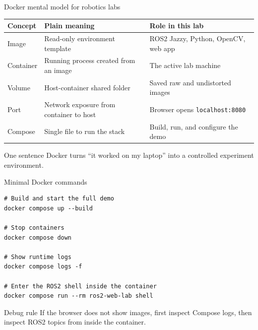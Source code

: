 \documentclass[aspectratio=169,10pt]{beamer}
\newcommand{\code}[1]{\texttt{#1}}
\begin{document}
\begin{frame}{Docker mental model for robotics labs}
  \begin{tabularx}{\textwidth}{@{}l X X@{}}
    \toprule
    Concept & Plain meaning & Role in this lab \\
    \midrule
    Image & Read-only environment template & ROS2 Jazzy, Python, OpenCV, web app \\
    Container & Running process created from an image & The active lab machine \\
    Volume & Host-container shared folder & Saved raw and undistorted images \\
    Port & Network exposure from container to host & Browser opens \code{localhost:8080} \\
    Compose & Single file to run the stack & Build, run, and configure the demo \\
    \bottomrule
  \end{tabularx}
  \vspace{0.7em}
  \begin{block}{One sentence}
    Docker turns ``it worked on my laptop'' into a controlled experiment environment.
  \end{block}
\end{frame}

\begin{frame}[fragile]{Minimal Docker commands}
  \begin{lstlisting}
# Build and start the full demo
docker compose up --build

# Stop containers
docker compose down

# Show runtime logs
docker compose logs -f

# Enter the ROS2 shell inside the container
docker compose run --rm ros2-web-lab shell
  \end{lstlisting}
  \vspace{0.8em}
  \begin{block}{Debug rule}
    If the browser does not show images, first inspect Compose logs, then inspect ROS2 topics from inside the container.
  \end{block}
\end{frame}
\end{document}

